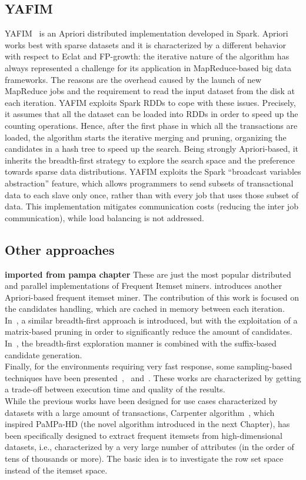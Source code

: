 \subsection{YAFIM}
YAFIM~\cite{YAFIM} is an Apriori distributed implementation developed in Spark.
Apriori works best with sparse datasets and it is characterized by a different
behavior with respect to Eclat and FP-growth: the iterative nature of the algorithm has
always represented a challenge for its application in MapReduce-based big data
frameworks. The reasons are the overhead caused by the launch of new MapReduce
jobs and the requirement to read the input dataset from the disk at each
iteration. YAFIM exploits Spark RDDs to cope with these issues. Precisely, it
assumes that all the dataset can be loaded into RDDs in order to speed up the
counting operations. Hence, after the first phase in which all the transactions
are loaded, the algorithm starts the iterative merging and pruning, organizing
the candidates in a hash tree to speed up the search.
Being strongly Apriori-based, it inherits the breadth-first strategy to explore
the search space and the preference towards sparse data distributions.
YAFIM exploits the Spark ``broadcast variables abstraction'' feature, which allows
programmers to send subsets of transactional data to each slave only once,
rather than with every job that uses those subset of data. This
implementation mitigates communication costs (reducing the inter job
communication), while load balancing is not addressed.

\subsection{Other approaches}
\textbf{imported from pampa chapter}
These are just the most popular distributed and parallel implementations of Frequent Itemset miners.
\cite{qiu2014yafim} introduces another Apriori-based frequent
itemset miner. The contribution of this work is focused on the candidates
handling, which are cached in memory between each iteration.
In~\cite{zhang2015distributed}, a similar breadth-first approach is introduced, but with the exploitation of a matrix-based pruning in order to significantly reduce the amount of candidates. In~\cite{liang2015sequence}, the breadth-first exploration manner is combined
with the suffix-based candidate generation.\\
Finally, for the environments requiring very fast response, some sampling-based techniques have been presented~\cite{riondato2015mining},~\cite{gole2015frequent} and~\cite{Wu2015}. These works are characterized by getting a trade-off between execution time and quality of the results. \\
While the previous works have been designed for use cases characterized by
datasets with a large amount of transactions,
Carpenter algorithm~\cite{Zaki_Carpenter}, which inspired PaMPa-HD (the novel algorithm introduced in the next Chapter),
has been specifically designed to extract frequent itemsets
from high-dimensional datasets, i.e., characterized by a very large number of
attributes (in the order of tens of thousands or more).
The basic idea is to investigate the row set space instead of the itemset
space.

